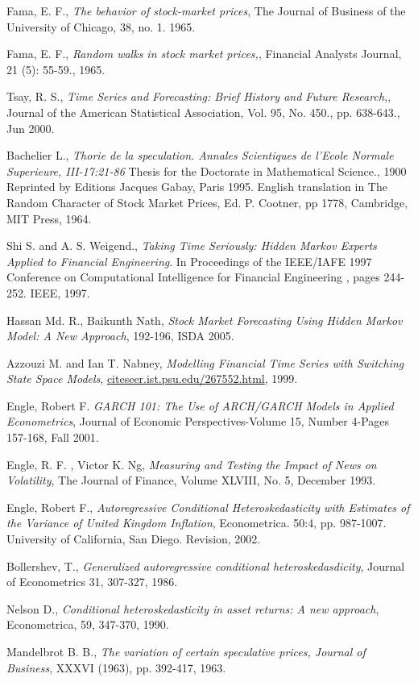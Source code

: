 \begin{thebibliography}{99}
 Fama, E. F.,
  {\em The behavior of stock-market prices},
  The Journal of Business of the University of Chicago, 38, no. 1.
  1965.

 Fama, E. F.,
  {\em Random walks in stock market prices,},
  Financial Analysts Journal, 21 (5): 55-59.,
  1965.
  
 Tsay, R. S.,
  {\em Time Series and Forecasting: Brief History and Future Research,},
  Journal of the American Statistical Association, Vol. 95, No. 450., pp. 638-643.,
  Jun 2000.

 Bachelier L.,
  {\em Thorie de la speculation. Annales Scientiques de l'Ecole Normale Superieure, III-17:21-86}
  Thesis for the Doctorate in Mathematical Science., 1900
  Reprinted by Editions Jacques Gabay, Paris 1995. English
  translation in The Random Character of Stock Market Prices, Ed. P. Cootner, pp
  1778, Cambridge, MIT Press, 1964.

 Shi S. and A. S. Weigend., {\em Taking Time Seriously: Hidden
  Markov Experts Applied to Financial Engineering}. In Proceedings of the
  IEEE/IAFE 1997 Conference on Computational Intelligence for Financial
  Engineering , pages 244-252. IEEE, 
  1997.

 Hassan Md. R., Baikunth Nath, 
  {\em Stock Market Forecasting Using Hidden Markov Model: A New Approach},
  192-196, 
  ISDA 2005.

 Azzouzi M.  and Ian T. Nabney,
  {\em Modelling Financial Time Series with Switching State Space Models},
  \url{citeseer.ist.psu.edu/267552.html},
  1999.
  
 Engle, Robert F. 
  {\em GARCH 101: The Use of ARCH/GARCH Models in Applied Econometrics},
  Journal of Economic Perspectives-Volume 15, Number 4-Pages 157-168, Fall
  2001. 
  
 Engle, R. F. , Victor K. Ng,  
  {\em Measuring and Testing the Impact of News on Volatility},
  The Journal of Finance, Volume XLVIII, No. 5, 
  December 1993.
  
 Engle, Robert F., {\em Autoregressive Conditional
  Heteroskedasticity with Estimates of the Variance of United Kingdom
  Inflation}, Econometrica. 50:4, pp. 987-1007. University of California, San
  Diego. Revision,
  2002.

 Bollershev, T.,
  {\em Generalized autoregressive conditional heteroskedasdicity}, Journal of
  Econometrics 31, 307-327,
  1986.
  
 Nelson D., 
  {\em Conditional heteroskedasticity in asset returns: A new approach},
  Econometrica, 59, 347-370, 
  1990.
    
 Mandelbrot B. B., 
  {\em The variation of certain speculative prices, Journal of Business},
  XXXVI (1963), pp. 392-417, 
  1963.

  
\end{thebibliography}

